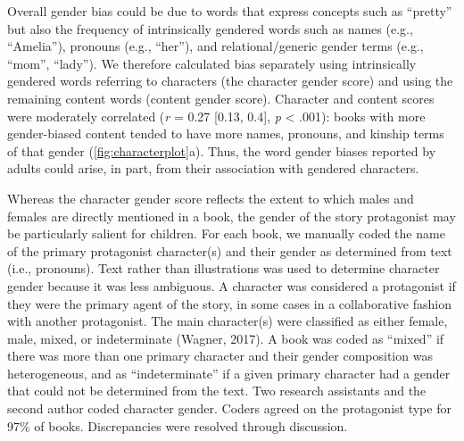 \documentclass[
  english,
  ,man,floatsintext]{apa6}
\begin{document}
Overall gender bias could be due to words that express concepts such as \enquote{pretty} but also the frequency of intrinsically gendered words such as names (e.g., \enquote{Amelia}), pronouns (e.g., \enquote{her}), and relational/generic gender terms (e.g., \enquote{mom}, \enquote{lady}). We therefore calculated bias separately using intrinsically gendered words referring to characters (the character gender score) and using the remaining content words (content gender score). Character and content scores were moderately correlated (\emph{r} = 0.27 {[}0.13, 0.4{]}, \emph{p} \textless{} .001): books with more gender-biased content tended to have more names, pronouns, and kinship terms of that gender (\autoref{fig:characterplot}a). Thus, the word gender biases reported by adults could arise, in part, from their association with gendered characters.

Whereas the character gender score reflects the extent to which males and females are directly mentioned in a book, the gender of the story protagonist may be particularly salient for children. For each book, we manually coded the name of the primary protagonist character(s) and their gender as determined from text (i.e., pronouns). Text rather than illustrations was used to determine character gender because it was less ambiguous. A character was considered a protagonist if they were the primary agent of the story, in some cases in a collaborative fashion with another protagonist. The main character(s) were classified as either female, male, mixed, or indeterminate (Wagner, 2017). A book was coded as \enquote{mixed} if there was more than one primary character and their gender composition was heterogeneous, and as \enquote{indeterminate} if a given primary character had a gender that could not be determined from the text. Two research assistants and the second author coded character gender. Coders agreed on the protagonist type for 97\% of books. Discrepancies were resolved through discussion.
\end{document}
